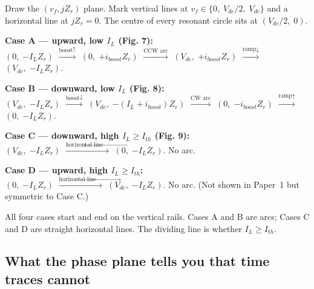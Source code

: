 \documentclass[12pt, a4paper]{article}
\def\,{ }%
\newcommand{\Vdc}{V_{dc}}
\newcommand{\IL}{I_L}
\newcommand{\Ith}{I_{th}}
\begin{document}
\begin{physbox}
Draw the $(v_f, jZ_r)$ plane.
Mark vertical lines at $v_f \in \{0,\; \Vdc/2,\; \Vdc\}$ and a horizontal
line at $jZ_r = 0$.
The centre of every resonant circle sits at $(\Vdc/2,\; 0)$.

\medskip
\noindent\textbf{Case A --- upward, low $\IL$ (Fig.\,7):}\\
\quad $(0,\;{-\IL Z_r})$
$\xrightarrow{\text{boost}\uparrow}$
$(0,\;{+i_{boost}Z_r})$
$\xrightarrow{\text{CCW arc}}$
$(\Vdc,\;{+i_{boost}Z_r})$
$\xrightarrow{\text{ramp}\downarrow}$
$(\Vdc,\;{-\IL Z_r})$.

\medskip
\noindent\textbf{Case B --- downward, low $\IL$ (Fig.\,8):}\\
\quad $(\Vdc,\;{-\IL Z_r})$
$\xrightarrow{\text{boost}\downarrow}$
$(\Vdc,\;{-(I_L+i_{boost})Z_r})$
$\xrightarrow{\text{CW arc}}$
$(0,\;{-i_{boost}Z_r})$
$\xrightarrow{\text{ramp}\uparrow}$
$(0,\;{-\IL Z_r})$.

\medskip
\noindent\textbf{Case C --- downward, high $\IL \geq \Ith$ (Fig.\,9):}\\
\quad $(\Vdc,\;{-\IL Z_r})$
$\xrightarrow{\text{horizontal line}\leftarrow}$
$(0,\;{-\IL Z_r})$.
\quad No arc.

\medskip
\noindent\textbf{Case D --- upward, high $\IL \geq \Ith$:}\\
\quad $(0,\;{-\IL Z_r})$
$\xrightarrow{\text{horizontal line}\rightarrow}$
$(\Vdc,\;{-\IL Z_r})$.
\quad No arc.
(Not shown in Paper~1 but symmetric to Case C.)

\medskip
All four cases start and end on the vertical rails.
Cases A and B are arcs; Cases C and D are straight horizontal lines.
The dividing line is whether $\IL \geq \Ith$.
\end{physbox}

\subsection{What the phase plane tells you that time traces cannot}
\label{ssec:pp_summary}
\end{document}
